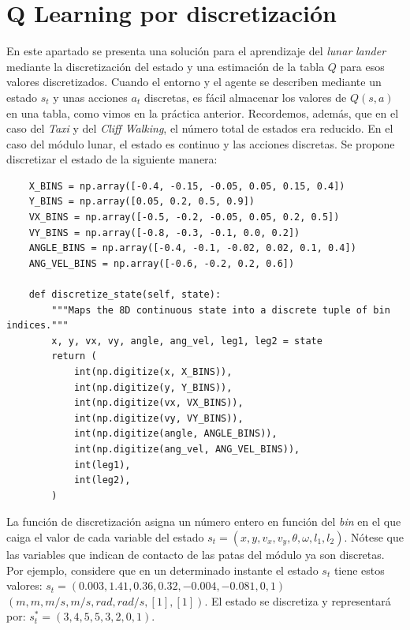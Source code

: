 \documentclass{article}
\begin{document}
\section{Q Learning por discretización}
En este apartado se presenta una solución para el aprendizaje del \textit{lunar} \textit{lander} mediante la discretización del estado y una estimación de la tabla $Q$ para esos valores discretizados. Cuando el entorno y el agente se describen mediante un estado $s_t$ y unas acciones $a_t$ discretas, es fácil almacenar los valores de $Q(s,a)$ en una tabla, como vimos en la práctica anterior. Recordemos, además, que en el caso del \textit{Taxi} y del \textit{Cliff Walking}, el número total de estados era reducido. En el caso del módulo lunar, el estado es continuo y las acciones discretas. Se propone discretizar el estado de la siguiente manera:
\begin{small}
\begin{verbatim}
    X_BINS = np.array([-0.4, -0.15, -0.05, 0.05, 0.15, 0.4])
    Y_BINS = np.array([0.05, 0.2, 0.5, 0.9])
    VX_BINS = np.array([-0.5, -0.2, -0.05, 0.05, 0.2, 0.5])
    VY_BINS = np.array([-0.8, -0.3, -0.1, 0.0, 0.2])
    ANGLE_BINS = np.array([-0.4, -0.1, -0.02, 0.02, 0.1, 0.4])
    ANG_VEL_BINS = np.array([-0.6, -0.2, 0.2, 0.6])
       
    def discretize_state(self, state):
        """Maps the 8D continuous state into a discrete tuple of bin indices."""
        x, y, vx, vy, angle, ang_vel, leg1, leg2 = state
        return (
            int(np.digitize(x, X_BINS)),
            int(np.digitize(y, Y_BINS)),
            int(np.digitize(vx, VX_BINS)),
            int(np.digitize(vy, VY_BINS)),
            int(np.digitize(angle, ANGLE_BINS)),
            int(np.digitize(ang_vel, ANG_VEL_BINS)),
            int(leg1),
            int(leg2),
        )
\end{verbatim}
\end{small}

La función de discretización asigna un número entero en función del \textit{bin} en el que caiga el valor de cada variable del estado $s_t=(x, y, v_x, v_y, \theta, \omega, l_1, l_2)$. Nótese que las variables que indican de contacto de las patas del módulo ya son discretas. 
Por ejemplo, considere que en un determinado instante el  estado $s_t$ tiene estos valores:
$s_t = (0.003, 1.41,  0.36, 0.32, -0.004, -0.081, 0, 1)$ $(m, m, m/s, m/s, rad, rad/s, [1], [1])$.
El estado se discretiza y representará por: 
$s^*_{t} = (3, 4, 5, 5, 3, 2, 0, 1)$.
\end{document}
